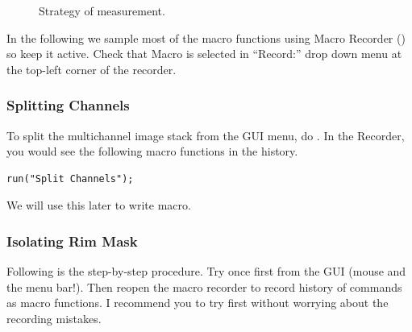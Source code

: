 \begin{figure}[h!]
 \quad
 \caption{Strategy of measurement.}
 \label{fig:nucsegProc}
\end{figure}


In the following we sample most of the macro functions using Macro Recorder () so keep it active. Check that Macro is selected in ``Record:'' drop down menu at the top-left corner of the recorder.

\subsubsection{Splitting Channels}

To split the multichannel image stack from the GUI menu, do . In the Recorder, you would see the following macro functions in the history. 
\begin{lstlisting}[numbers=none]
run("Split Channels");
\end{lstlisting}
We will use this later to write macro. 

\subsubsection{Isolating Rim Mask}
Following is the step-by-step procedure. Try once first from the GUI (mouse and the menu bar!). Then reopen the macro recorder to record history of commands as macro functions. I recommend you to try first without worrying about the recording mistakes. 

